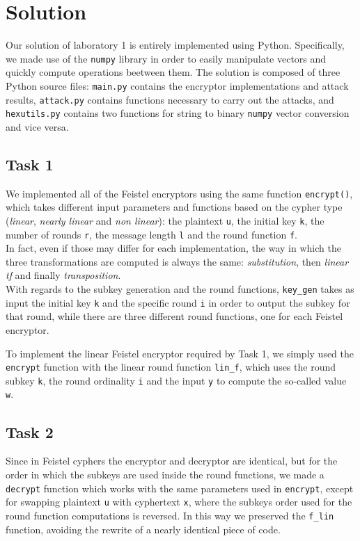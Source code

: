 \documentclass{report}
\begin{document}
\chapter*{Solution}
Our solution of laboratory 1 is entirely implemented using Python. Specifically, we made use of the {\tt numpy} library in order to easily manipulate vectors and quickly compute operations beetween them. The solution is composed of three Python source files: {\tt main.py} contains the encryptor implementations and attack results, {\tt attack.py} contains functions necessary to carry out the attacks, and {\tt hexutils.py} contains two functions for string to binary {{\tt numpy}} vector conversion and vice versa.
		
\section*{Task 1}
We implemented all of the Feistel encryptors using the same function {\tt encrypt()}, which takes different input parameters and functions based on the cypher type (\textit{linear}, \textit{nearly linear} and \textit{non linear}): the plaintext {\tt u}, the initial key {\tt k}, the number of rounds {\tt r}, the message length {\tt l} and the round function {\tt f}.\\ In fact, even if those may differ for each implementation, the way in which the three transformations are computed is always the same: \textit{substitution}, then \textit{linear tf} and finally \textit{transposition}.\\
With regards to the subkey generation and the round functions, {\tt key\_gen} takes as input the initial key {\tt k} and the specific round {\tt i} in order to output the subkey for that round, while there are three different round functions, one for each Feistel encryptor.

To implement the linear Feistel encryptor required by Task 1, we simply used the {\tt encrypt} function with the linear round function {\tt lin\_f}, which uses the round subkey {\tt k}, the round ordinality {\tt i} and the input {\tt y} to compute the so-called value {\tt w}.   

\section*{Task 2}
Since in Feistel cyphers the encryptor and decryptor are identical, but for the order in which the subkeys are used inside the round functions, we made a {\tt decrypt} function which works with the same parameters used in {\tt encrypt}, except for swapping plaintext {\tt u} with cyphertext {\tt x}, where the subkeys order used for the round function computations is reversed. In this way we preserved the {\tt f\_lin} function, avoiding the rewrite of a nearly identical piece of code.
\end{document}
